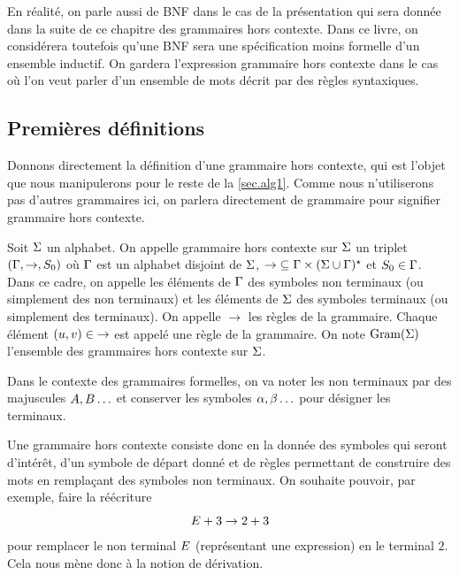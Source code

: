 \begin{remark}
  En réalité, on parle aussi de BNF dans le cas de la présentation qui sera
  donnée dans la suite de ce chapitre des grammaires hors contexte. Dans ce
  livre, on considérera toutefois qu'une BNF sera une spécification moins
  formelle d'un ensemble inductif. On gardera l'expression \og grammaire hors
  contexte\fg{} dans le cas où l'on veut parler d'un ensemble de mots décrit par
  des règles syntaxiques.
\end{remark}

\subsection{Premières définitions}

Donnons directement la définition d'une grammaire hors contexte, qui est l'objet
que nous manipulerons pour le reste de la \cref{sec.alg1}. Comme nous
n'utiliserons pas d'autres grammaires ici, on parlera directement de grammaire
pour signifier \og grammaire hors contexte\fg{}.

\begin{definition}
  Soit $\Sigma$ un alphabet. On appelle grammaire hors contexte sur $\Sigma$ un
  triplet $(\Gamma,\to,S_{0})$ où $\Gamma$ est un alphabet disjoint de $\Sigma$,
  $\mathord{\to}\subseteq \Gamma\times (\Sigma \cup \Gamma)^{\star}$ et
  $S_{0} \in \Gamma$. Dans ce cadre, on appelle les éléments de $\Gamma$ des
  symboles non terminaux (ou simplement des non terminaux) et les éléments de
  $\Sigma$ des symboles terminaux (ou simplement des terminaux). On appelle $\to$
  les règles de la grammaire. Chaque élément $(u,v)\in\mathord{\to}$
  est appelé une règle de la grammaire. On note $\operatorname{Gram}(\Sigma)$ l'ensemble des
  grammaires hors contexte sur $\Sigma$.
\end{definition}

\begin{notation}
  Dans le contexte des grammaires formelles, on va noter les non terminaux par
  des majuscules $A,B\ldots$ et conserver les symboles
  $\alpha,\beta\ldots$ pour désigner les terminaux.
\end{notation}

Une grammaire hors contexte consiste donc en la donnée des symboles qui seront
d'intérêt, d'un symbole de départ donné et de règles permettant de construire
des mots en remplaçant des symboles non terminaux. On souhaite pouvoir, par
exemple, faire la réécriture
\[E + 3 \to 2 + 3\]
pour remplacer le non terminal $E$ (représentant une expression) en le
terminal $2$. Cela nous mène donc à la notion de dérivation.


